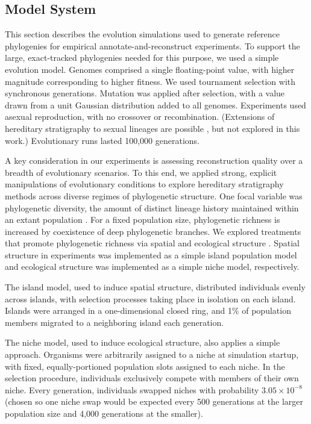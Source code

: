 \subsection{Model System}

This section describes the evolution simulations used to generate reference phylogenies for empirical annotate-and-reconstruct experiments.
To support the large, exact-tracked phylogenies needed for this purpose, we used a simple evolution model.
Genomes comprised a single floating-point value, with higher magnitude corresponding to higher fitness.
We used tournament selection with synchronous generations.
Mutation was applied after selection, with a value drawn from a unit Gaussian distribution added to all genomes.
Experiments used asexual reproduction, with no crossover or recombination.
(Extensions of hereditary stratigraphy to sexual lineages are possible \citep{moreno2024methods}, but not explored in this work.)
Evolutionary runs lasted 100,000 generations.

A key consideration in our experiments is assessing reconstruction quality over a breadth of evolutionary scenarios.
To this end, we applied strong, explicit manipulations of evolutionary conditions to explore hereditary stratigraphy methods across diverse regimes of phylogenetic structure.
One focal variable was phylogenetic diversity, the amount of distinct lineage history maintained within an extant population \citep{tucker2017guide}.
For a fixed population size, phylogenetic richness is increased by coexistence of deep phylogenetic branches.
We explored treatments that promote phylogenetic richness via spatial and ecological structure \citep{moreno2024ecology,gomez2019understanding,valiente2007facilitation}.
Spatial structure in experiments was implemented as a simple island population model and ecological structure was implemented as a simple niche model, respectively.

The island model, used to induce spatial structure, distributed individuals evenly across islands, with selection processes taking place in isolation on each island.
Islands were arranged in a one-dimensional closed ring, and 1\% of population members migrated to a neighboring island each generation.

The niche model, used to induce ecological structure, also applies a simple approach.
Organisms were arbitrarily assigned to a niche at simulation startup, with fixed, equally-portioned population slots assigned to each niche.
In the selection procedure, individuals exclusively compete with members of their own niche.
Every generation, individuals swapped niches with probability $3.05 \times 10^{-8}$ (chosen so one niche swap would be expected every 500 generations at the larger population size and 4,000 generations at the smaller).

